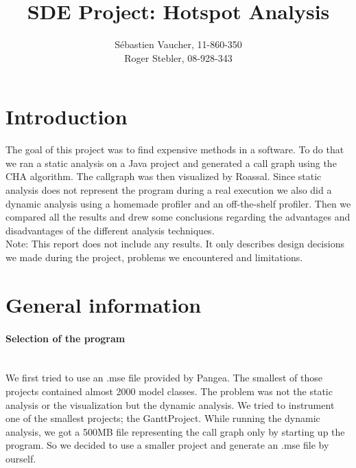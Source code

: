 \documentclass{paper}
\title{SDE Project: Hotspot Analysis}
\author{S\'{e}bastien Vaucher, 11-860-350\\Roger Stebler, 08-928-343}
\begin{document}
\maketitle


%

\section{Introduction}
The goal of this project was to find expensive methods in a software. To do that we ran a static analysis on a Java project and generated a call graph using the CHA algorithm. The callgraph was then visualized by Roassal. Since static analysis does not represent the program during a real execution we also did a dynamic analysis using a homemade profiler and an off-the-shelf profiler. Then we compared all the results and drew some conclusions regarding the advantages and disadvantages of the different analysis techniques.\\


Note: This report does not include any results. It only describes design decisions we made during the project, problems we encountered and limitations.

\section{General information}

\paragraph{Selection of the program}\mbox{}\vspace{10pt}\\
We first tried to use an .mse file provided by Pangea. The smallest of those projects contained almost 2000 model classes. The problem was not the static analysis or the visualization but the dynamic analysis. We tried to instrument one of the smallest projects; the GanttProject. While running the dynamic analysis, we got a 500MB file representing the call graph only by starting up the program. So we decided to use a smaller project and generate an .mse file by ourself.
\end{document}
